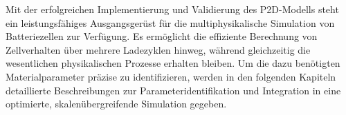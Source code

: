 Mit der erfolgreichen Implementierung und Validierung des P2D-Modells steht ein leistungsfähiges Ausgangsgerüst für die multiphysikalische Simulation von Batteriezellen zur Verfügung. Es ermöglicht die effiziente Berechnung von Zellverhalten über mehrere Ladezyklen hinweg, während gleichzeitig die wesentlichen physikalischen Prozesse erhalten bleiben.
Um die dazu benötigten Materialparameter präzise zu identifizieren, werden in den folgenden Kapiteln detaillierte Beschreibungen zur Parameteridentifikation und Integration in eine optimierte, skalenübergreifende Simulation gegeben.